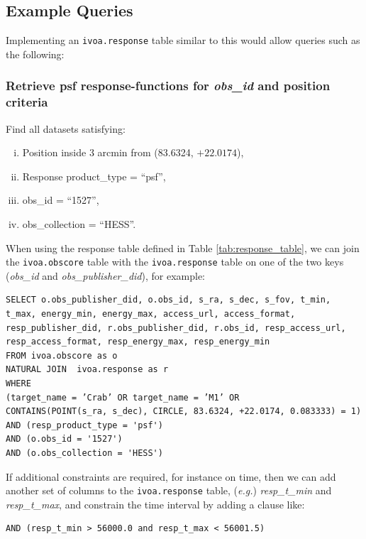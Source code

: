 \subsection*{Example Queries}
\noindent Implementing an {\tt ivoa.response} table similar to this would allow queries such as the following:
\subsubsection*{Retrieve {\bf psf} {\bf response-function}s for {\em obs\_id\/} and position criteria}
\noindent Find all datasets satisfying:
\begin{enumerate}[(i)]
 \item Position inside 3 arcmin from (83.6324, $+22.0174$),
 \item Response product\_type = ``psf'',
 \item obs\_id = ``1527'',
 \item obs\_collection = ``HESS''.
\end{enumerate}

When using the response table defined in Table \ref{tab:response_table}, we can join the {\tt ivoa.obscore} table with the {\tt ivoa.response} table on one of the two keys ({\em obs\_id\/} and {\em obs\_publisher\_did\/}), for example:
{\small
\begin{verbatim}
SELECT o.obs_publisher_did, o.obs_id, s_ra, s_dec, s_fov, t_min,
t_max, energy_min, energy_max, access_url, access_format,
resp_publisher_did, r.obs_publisher_did, r.obs_id, resp_access_url,
resp_access_format, resp_energy_max, resp_energy_min
FROM ivoa.obscore as o
NATURAL JOIN  ivoa.response as r
WHERE
(target_name = ’Crab’ OR target_name = ’M1’ OR
CONTAINS(POINT(s_ra, s_dec), CIRCLE, 83.6324, +22.0174, 0.083333) = 1)
AND (resp_product_type = 'psf')
AND (o.obs_id = '1527')
AND (o.obs_collection = 'HESS')
\end{verbatim}
}
If additional constraints are required, for instance on time, then we can add another set of columns to the {\tt ivoa.response} table, ({\em e.g.\/}\null) {\em resp\_t\_min\/} and {\em resp\_t\_max\/}, and constrain the time interval by adding a clause like:
{\small
\begin{verbatim}
AND (resp_t_min > 56000.0 and resp_t_max < 56001.5)
\end{verbatim}
}

